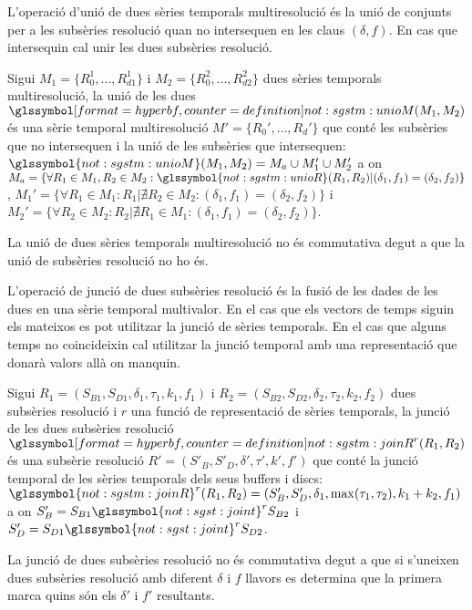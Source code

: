 L'operació d'unió de dues sèries temporals multiresolució és la unió
de conjunts per a les subsèries resolució quan no intersequen en les
claus $(\delta,f)$. En cas que intersequin cal unir les dues subsèries
resolució.
\begin{definition}
  Sigui $M_1=\{R_0^1,\dotsc,R_{d1}^1\}$ i
  $M_2=\{R_0^2,\dotsc,R_{d2}^2\}$ dues sèries temporals
  multiresolució, la unió de les dues
  $\glssymboldef{not:sgstm:unioM}(M_1, M_2)$ és una sèrie temporal
  multiresolució $M'=\{R_0',\dotsc,R_d'\}$ que conté les subsèries que
  no intersequen i la unió de les subsèries que intersequen:
  $\glssymbol{not:sgstm:unioM}(M_1, M_2)= M_{a} \cup M'_{1} \cup
  M'_{2}$ a on $M_a = \{\forall R_1\in M_1,R_2\in M_2:
  \glssymbol{not:sgstm:unioR}(R_1,R_2) | (\delta_1,f_1) =
  (\delta_2,f_2) \}$, $M_1' =\{\forall R_1\in M_1: R_1 | \nexists R_2
  \in M_2 : (\delta_1,f_1) = (\delta_2,f_2) \}$ i $M_2' =\{\forall
  R_2\in M_2: R_2 | \nexists R_1 \in M_1 : (\delta_1,f_1) =
  (\delta_2,f_2) \}$.
\end{definition}
La unió de dues sèries temporals multiresolució no és commutativa
degut a que la unió de subsèries resolució no ho és.





L'operació de junció de dues subsèries resolució és la fusió de les
dades de les dues en una sèrie temporal multivalor. En el cas que els
vectors de temps siguin els mateixos es pot utilitzar la junció de
sèries temporals. En el cas que alguns temps no coincideixin cal
utilitzar la junció temporal amb una representació que donarà valors
allà on manquin.
\begin{definition}
  Sigui $R_1=(S_{B1},S_{D1},\delta_1,\tau_1,k_1,f_1)$ i
  $R_2=(S_{B2},S_{D2},\delta_2,\tau_2,k_2,f_2)$ dues subsèries
  resolució i $r$ una funció de representació de sèries temporals, la
  junció de les dues subsèries resolució
  $\glssymboldef{not:sgstm:joinR}^r(R_1,R_2)$ és una subsèrie
  resolució $R' = (S'_B,S'_D,\delta',\tau',k',f')$ que conté la junció
  temporal de les sèries temporals dels seus buffers i discs:
  $\glssymbol{not:sgstm:joinR}^r(R_1,R_2)=
  (S'_B,S'_D,\delta_1,\max(\tau_1,\tau_2),k_1+k_2,f_1)$ a on $S'_B =
  S_{B1} \glssymbol{not:sgst:joint}^r S_{B2}$ i $S'_D = S_{D1}
  \glssymbol{not:sgst:joint}^r S_{D2}$.
\end{definition}
La junció de dues subsèries resolució no és commutativa degut a que si
s'uneixen dues subsèries resolució amb diferent $\delta$ i $f$ llavors
es determina que la primera marca quins són els $\delta'$ i $f'$
resultants.



